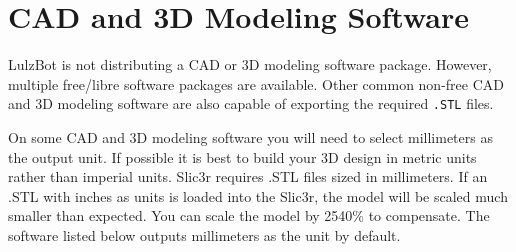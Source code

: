 \begin{comment}
\subsection{Loading print files}
\index{load files}
\index{gcode}
\index{Printrun}

To load a \texttt{.gcode} file into Printrun click the \texttt{Load file} button. Navigate to the \texttt{.gcode} file in the file browser and click \texttt{Open}. You will now see a 2D image of the first layer of your model design in the .gcode viewer
(Figure \ref{fig:printrun_viewer}, page \pageref{fig:printrun_viewer}).
\begin{figure}[hbt]
\centering
\texttt{[image: printrun\_viewer.png]}
\caption{Printrun viewer}
\label{fig:printrun_viewer}
\end{figure}
Click the .gcode viewer window to see a more detailed version of the sliced model. In the pop-up .gcode viewer you can zoom in using the mouse scroll wheel and flip through layers with the up and down arrow keys. To pan within the window, left-click and drag to move around the work plane. The lines shown in the .gcode viewer represent the path the extrusion nozzle will follow to print the model.

For more information on using Printrun, see the Printrun page in the Support/Downloads section at \texttt{https://www.lulzbot.com/?q=support}. Instructions for running a print can be found in the Starting the First Print section in this manual.
\end{comment}

\section{CAD and 3D Modeling Software}

LulzBot is not distributing a CAD or 3D modeling software package. However, multiple free/libre software packages are available. Other common non-free CAD and 3D modeling software are also capable of exporting the required \texttt{.STL} files.

On some CAD and 3D modeling software you will need to select millimeters as the output unit. If possible it is best to build your 3D design in metric units rather than imperial units. Slic3r requires .STL files sized in millimeters. If an .STL with inches as units is loaded into the Slic3r, the model will be scaled much smaller than expected. You can scale the model by 2540\% to compensate. The software listed below outputs millimeters as the unit by default.

